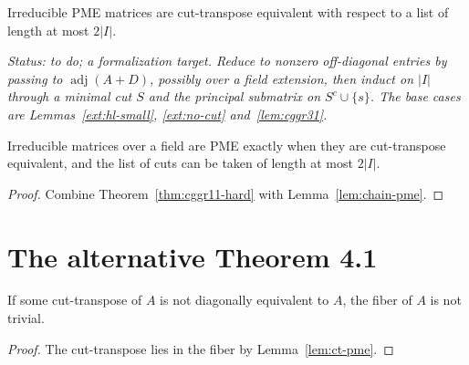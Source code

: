 \begin{theorem}
\label{thm:cggr11-hard}
\leanok
{}
Irreducible PME matrices are cut-transpose equivalent with respect to a list of length at
most $2|I|$.
\end{theorem}
\noindent\emph{Status: to do; a formalization target. Reduce to nonzero off-diagonal
entries by passing to $\operatorname{adj}(A+D)$, possibly over a field extension, then
induct on $|I|$ through a minimal cut $S$ and the principal submatrix on $S^c\cup\{s\}$.
The base cases are Lemmas~\ref{ext:hl-small}, \ref{ext:no-cut} and~\ref{lem:cggr31}.}

\begin{theorem}
\label{thm:cggr11}
\leanok
{}
Irreducible matrices over a field are PME exactly when they are cut-transpose equivalent,
and the list of cuts can be taken of length at most $2|I|$.
\end{theorem}
\begin{proof}
\leanok
Combine Theorem~\ref{thm:cggr11-hard} with Lemma~\ref{lem:chain-pme}.
\end{proof}

\section{The alternative Theorem 4.1}

\begin{lemma}
\label{lem:ct-nontrivial}
\leanok
{}
If some cut-transpose of $A$ is not diagonally equivalent to $A$, the fiber of $A$ is not
trivial.
\end{lemma}
\begin{proof}
\leanok
The cut-transpose lies in the fiber by Lemma~\ref{lem:ct-pme}.
\end{proof}

